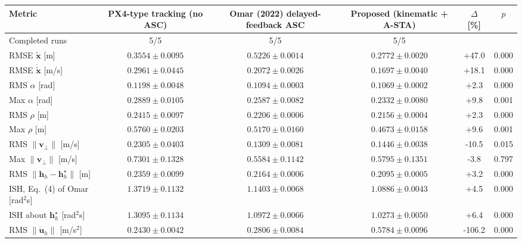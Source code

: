 \begin{tabular}{lccccc}
\toprule
Metric & PX4-type tracking (no ASC) & Omar (2022) delayed-feedback ASC & Proposed (kinematic + A-STA) & $\Delta$ [\%] & $p$ \\
\midrule
Completed runs & 5/5 & 5/5 & 5/5 & & \\
RMSE $\tilde{\mathbf{x}}$ [m] & $0.3554 \pm 0.0095$ & $0.5226 \pm 0.0014$ & $0.2772 \pm 0.0020$ & +47.0 & 0.000 \\
RMSE $\dot{\tilde{\mathbf{x}}}$ [m/s] & $0.2961 \pm 0.0445$ & $0.2072 \pm 0.0026$ & $0.1697 \pm 0.0040$ & +18.1 & 0.000 \\
RMS $\alpha$ [rad] & $0.1198 \pm 0.0048$ & $0.1094 \pm 0.0003$ & $0.1069 \pm 0.0002$ & +2.3 & 0.000 \\
Max $\alpha$ [rad] & $0.2889 \pm 0.0105$ & $0.2587 \pm 0.0082$ & $0.2332 \pm 0.0080$ & +9.8 & 0.001 \\
RMS $\rho$ [m] & $0.2415 \pm 0.0097$ & $0.2206 \pm 0.0006$ & $0.2156 \pm 0.0004$ & +2.3 & 0.000 \\
Max $\rho$ [m] & $0.5760 \pm 0.0203$ & $0.5170 \pm 0.0160$ & $0.4673 \pm 0.0158$ & +9.6 & 0.001 \\
RMS $\|\mathbf{v}_\perp\|$ [m/s] & $0.2305 \pm 0.0403$ & $0.1309 \pm 0.0081$ & $0.1446 \pm 0.0038$ & -10.5 & 0.015 \\
Max $\|\mathbf{v}_\perp\|$ [m/s] & $0.7301 \pm 0.1328$ & $0.5584 \pm 0.1142$ & $0.5795 \pm 0.1351$ & -3.8 & 0.797 \\
RMS $\|\mathbf{h}_h-\mathbf{h}^\star_h\|$ [m] & $0.2359 \pm 0.0099$ & $0.2164 \pm 0.0006$ & $0.2095 \pm 0.0005$ & +3.2 & 0.000 \\
ISH, Eq.~(4) of Omar [rad$^2$s] & $1.3719 \pm 0.1132$ & $1.1403 \pm 0.0068$ & $1.0886 \pm 0.0043$ & +4.5 & 0.000 \\
ISH about $\mathbf{h}^\star_h$ [rad$^2$s] & $1.3095 \pm 0.1134$ & $1.0972 \pm 0.0066$ & $1.0273 \pm 0.0050$ & +6.4 & 0.000 \\
RMS $\|\dot{\mathbf{u}}_h\|$ [m/s$^2$] & $0.2430 \pm 0.0042$ & $0.2806 \pm 0.0084$ & $0.5784 \pm 0.0096$ & -106.2 & 0.000 \\
\bottomrule
\end{tabular}
